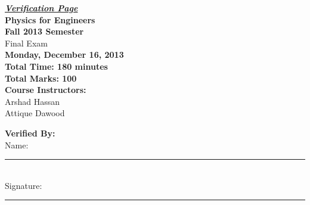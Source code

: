 \documentclass[12pt,a4paper]{article}
\begin{document}
\begin{center}
{\Huge \underline{\textbf{\textit{Verification Page}}}}\\[1.75cm]
{\LARGE \textbf{Physics for Engineers}}\\[0.15cm]
{\normalsize \textbf{Fall 2013 Semester}}\\[0.15cm]
{\Large {Final Exam}}\\[0.15cm]
{\normalsize \textbf{Monday, December 16, 2013}}\\[0.45cm]
{\Large \textbf{Total Time: 180 minutes}}\\[0.15cm]
{\Large \textbf{Total Marks: 100}}\\[0.35cm]
\textbf{Course Instructors:}\\
Arshad Hassan\\
Attique Dawood\\[0.5cm]
\end{center}
\textbf{Verified By:}\\[0.55cm]
Name: \rule{5.65cm}{0.2mm}\\[0.55cm]
Signature: \rule{5cm}{0.2mm}\\[0.55cm]
\end{document}
